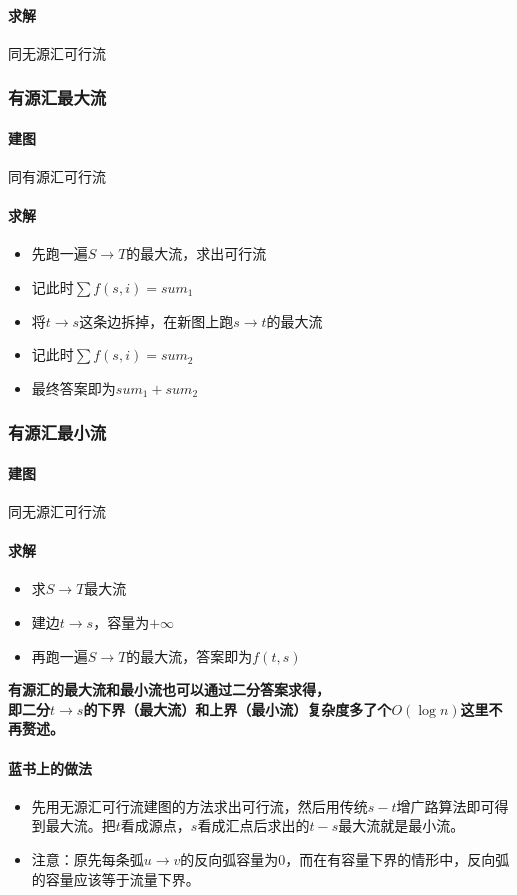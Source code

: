 \documentclass[twoside]{article}
\begin{document}
\paragraph{求解} 同无源汇可行流

\subsubsection*{有源汇最大流}
\paragraph{建图} 同有源汇可行流
\paragraph{求解}
\begin{itemize}
\item 先跑一遍$S \rightarrow T$的最大流，求出可行流
\item 记此时$\sum f(s,i) = sum_1$
\item 将$t \rightarrow s$这条边拆掉，在新图上跑$s \rightarrow t$的最大流
\item 记此时$\sum f(s,i) = sum_2$
\item 最终答案即为$sum_1 + sum_2$
\end{itemize}

\subsubsection*{有源汇最小流}
\paragraph{建图} 同无源汇可行流
\paragraph{求解}
\begin{itemize}
\item 求$S \rightarrow T$最大流
\item 建边$t \rightarrow s$，容量为$+\infty$
\item 再跑一遍$S \rightarrow T$的最大流，答案即为$f(t,s)$
\end{itemize}

\textbf{有源汇的最大流和最小流也可以通过二分答案求得，\\即二分$t \rightarrow s$的下界（最大流）和上界（最小流）复杂度多了个$O(\log n)$这里不再赘述。}

\paragraph{蓝书上的做法}
\begin{itemize}
\item 先用无源汇可行流建图的方法求出可行流，然后用传统$s-t$增广路算法即可得到最大流。把$t$看成源点，$s$看成汇点后求出的$t-s$最大流就是最小流。
\item 注意：原先每条弧$u \rightarrow v$的反向弧容量为$0$，而在有容量下界的情形中，反向弧的容量应该等于流量下界。
\end{itemize}
\end{document}
